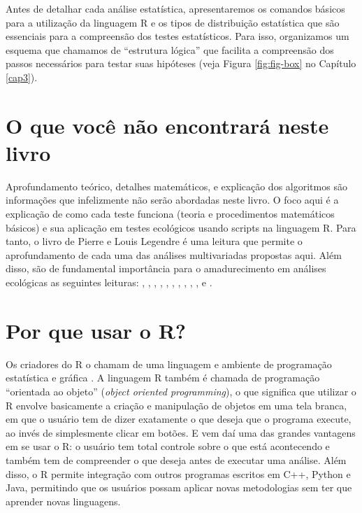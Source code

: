 \documentclass[
]{book}
\begin{document}
Antes de detalhar cada análise estatística, apresentaremos os comandos básicos para a utilização da linguagem R e os tipos de distribuição estatística que são essenciais para a compreensão dos testes estatísticos. Para isso, organizamos um esquema que chamamos de ``estrutura lógica'' que facilita a compreensão dos passos necessários para testar suas hipóteses (veja Figura \ref{fig:fig-box} no Capítulo \ref{cap3}).

\hypertarget{o-que-vocuxea-nuxe3o-encontraruxe1-neste-livro}{%
\section{O que você não encontrará neste livro}\label{o-que-vocuxea-nuxe3o-encontraruxe1-neste-livro}}

Aprofundamento teórico, detalhes matemáticos, e explicação dos algoritmos são informações que infelizmente não serão abordadas neste livro. O foco aqui é a explicação de como cada teste funciona (teoria e procedimentos matemáticos básicos) e sua aplicação em testes ecológicos usando scripts na linguagem R. Para tanto, o livro de Pierre e Louis Legendre \citep{legendre_numerical_2012} é uma leitura que permite o aprofundamento de cada uma das análises multivariadas propostas aqui. Além disso, são de fundamental importância para o amadurecimento em análises ecológicas as seguintes leituras: \citet{manly_randomization_1991}, \citet{pinheiro_mixed-effects_2000}, \citet{scheiner_design_2001}, \citet{burnham_pvalues_2014}, \citet{quinn_experimental_2002}, \citet{venables_modern_2002}, \citet{magurran_biological_2011}, \citet{gotelli_primer_2013}, \citet{zar_biostatistical_2010}, \citet{zuur_protocol_2009}, \citet{crawley_r_2012} e \citet{james_introduction_2013}.

\hypertarget{por-que-usar-o-r}{%
\section{Por que usar o R?}\label{por-que-usar-o-r}}

Os criadores do R o chamam de uma linguagem e ambiente de programação estatística e gráfica \citep{venables_modern_2002}. A linguagem R também é chamada de programação ``orientada ao objeto'' (\emph{object oriented programming}), o que significa que utilizar o R envolve basicamente a criação e manipulação de objetos em uma tela branca, em que o usuário tem de dizer exatamente o que deseja que o programa execute, ao invés de simplesmente clicar em botões. E vem daí uma das grandes vantagens em se usar o R: o usuário tem total controle sobre o que está acontecendo e também tem de compreender o que deseja antes de executar uma análise. Além disso, o R permite integração com outros programas escritos em C++, Python e Java, permitindo que os usuários possam aplicar novas metodologias sem ter que aprender novas linguagens.
\end{document}
